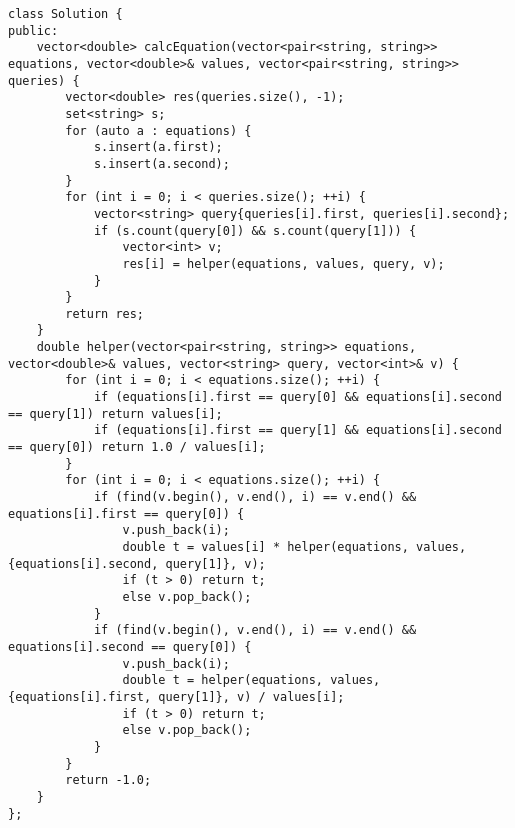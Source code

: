 \begin{lstlisting}
class Solution {
public:
    vector<double> calcEquation(vector<pair<string, string>> equations, vector<double>& values, vector<pair<string, string>> queries) {
        vector<double> res(queries.size(), -1);
        set<string> s;
        for (auto a : equations) {
            s.insert(a.first);
            s.insert(a.second);
        }
        for (int i = 0; i < queries.size(); ++i) {
            vector<string> query{queries[i].first, queries[i].second};
            if (s.count(query[0]) && s.count(query[1])) {
                vector<int> v;
                res[i] = helper(equations, values, query, v);
            }   
        }
        return res;
    }
    double helper(vector<pair<string, string>> equations, vector<double>& values, vector<string> query, vector<int>& v) {
        for (int i = 0; i < equations.size(); ++i) {
            if (equations[i].first == query[0] && equations[i].second == query[1]) return values[i];
            if (equations[i].first == query[1] && equations[i].second == query[0]) return 1.0 / values[i];
        }
        for (int i = 0; i < equations.size(); ++i) {
            if (find(v.begin(), v.end(), i) == v.end() && equations[i].first == query[0]) {
                v.push_back(i);
                double t = values[i] * helper(equations, values, {equations[i].second, query[1]}, v);
                if (t > 0) return t;
                else v.pop_back();
            }
            if (find(v.begin(), v.end(), i) == v.end() && equations[i].second == query[0]) {
                v.push_back(i);
                double t = helper(equations, values, {equations[i].first, query[1]}, v) / values[i];
                if (t > 0) return t;
                else v.pop_back();
            }
        }
        return -1.0;
    }
};



\end{lstlisting}

